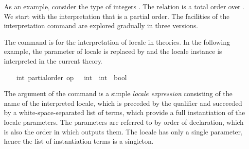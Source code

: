 \begin{isabellebody}
\begin{isamarkuptext}
  As an example, consider the type of integers .  The
  relation  is a total order over .  We start
  with the interpretation that  is a partial order.  The
  facilities of the interpretation command are explored gradually in
  three versions.%
\end{isamarkuptext}%
\isamarkuptrue%
%
\isamarkuptrue%
%
\begin{isamarkuptext}%
The command  is for the interpretation of
  locale in theories.  In the following example, the parameter of locale
   is replaced by  and the locale instance is interpreted in the current
  theory.%
\end{isamarkuptext}%
\isamarkuptrue%
%
\isadelimvisible
\ \ %
\endisadelimvisible
%
\isatagvisible
{}\isamarkupfalse%
\ int{}\ partial{}order\ {}op\ {}\ {}{}\ int\ {}\ int\ {}\ bool{}%
\begin{isamarkuptxt}%
\normalsize
  The argument of the command is a simple \emph{locale expression}
  consisting of the name of the interpreted locale, which is
  preceded by the qualifier  and succeeded by a
  white-space-separated list of terms, which provide a full
  instantiation of the locale parameters.  The parameters are referred
  to by order of declaration, which is also the order in which
   outputs them.  The locale has only a
  single parameter, hence the list of instantiation terms is a
  singleton.


\end{isamarkuptxt}
\end{isabellebody}
